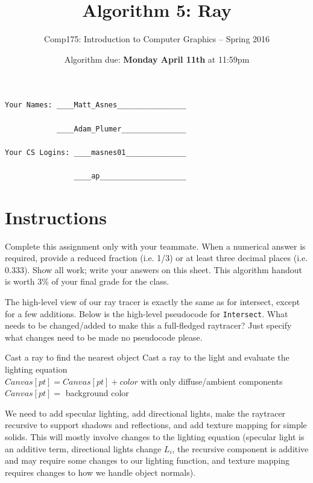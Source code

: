 \documentclass[10pt,twocolumn]{article}
\title{\Huge{\bf Algorithm 5: Ray}}
\author{Comp175: Introduction to Computer Graphics -- Spring 2016}
\date{Algorithm due:  {\bf Monday April 11th} at 11:59pm}                                         %
\begin{document}
\maketitle

\begin{verbatim}
Your Names: ____Matt_Asnes________________

            ____Adam_Plumer_______________

Your CS Logins: ____masnes01______________

                ____ap____________________
\end{verbatim}

\section{Instructions}
Complete this assignment only with your teammate. When a numerical answer is required, provide a reduced fraction (i.e. 1/3) or at least three decimal places (i.e. 0.333). Show all work; write your answers on this sheet. This algorithm handout is worth 3\% of your final grade for the class.

\begin{framed}
\noindent{\bf[2 points]} The high-level view of our ray tracer is exactly the same as for intersect, except for a few additions. Below is the high-level pseudocode for {\tt Intersect}. What needs to be changed/added to make this a full-fledged raytracer? Just specify what changes need to be made {no pseudocode please.}

\footnotesize{
\begin{algorithmic}
	\STATE Cast a ray to find the nearest object
			\STATE Cast a ray to the light and evaluate the lighting equation\\
			\STATE $Canvas[pt] = Canvas[pt]+ color$ with only diffuse/ambient components\\
		\ENDFOR
	\ELSE 
		\STATE $Canvas[pt] =$ background color
	\ENDIF
\ENDFOR
\end{algorithmic}
}

We need to add specular lighting, add directional lights, make the raytracer recursive to support shadows and reflections, and add texture mapping for simple solids. This will mostly involve changes to the lighting equation (specular light is an additive term, directional lights change $L_i$, the recursive component is additive and may require some changes to our lighting function, and texture mapping requires changes to how we handle object normals).
\end{framed}
\end{document}
